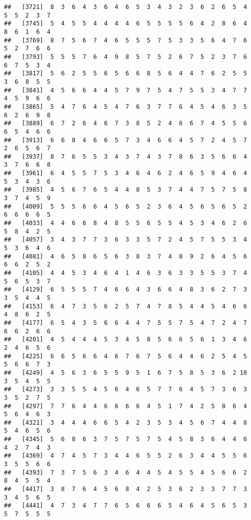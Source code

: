 \documentclass[
]{book}
\begin{document}
\begin{verbatim}
##   [3721]  8  3  6  4  3  6  4  6  5  3  4  3  2  3  6  2  6  5  4  5  5  2  3  7
##   [3745]  5  4  5  5  4  4  4  4  6  5  5  5  5  6  4  2  8  6  4  8  6  1  6  4
##   [3769]  8  7  5  6  7  4  6  5  5  5  7  5  3  3  5  6  4  7  6  5  2  7  6  6
##   [3793]  5  5  5  7  6  4  9  8  5  7  5  2  6  7  5  2  3  7  6  6  7  5  3  4
##   [3817]  5  6  2  5  5  6  5  6  6  8  5  6  4  4  7  6  2  5  5  3  6  8  5  5
##   [3841]  4  5  6  6  4  4  5  7  9  7  5  4  7  5  5  3  4  7  7  4  5  9  6  6
##   [3865]  5  4  7  6  4  5  4  7  6  3  7  7  6  4  5  4  6  3  5  6  2  6  9  8
##   [3889]  6  7  2  6  4  6  7  3  8  5  2  4  6  6  7  4  5  5  6  6  5  4  6  6
##   [3913]  6  6  8  4  6  6  5  7  3  4  6  6  4  5  7  2  4  5  7  2  6  5  6  7
##   [3937]  8  7  6  5  5  3  4  3  7  4  3  7  8  6  3  5  6  6  4  3  7  6  6  8
##   [3961]  6  4  5  5  7  5  3  4  6  4  6  2  4  6  5  9  4  6  4  5  3  4  3  6
##   [3985]  4  5  6  7  6  5  4  4  8  5  3  7  4  4  7  5  7  5  8  3  7  4  5  9
##   [4009]  5  5  5  6  6  4  5  6  5  2  3  6  4  5  6  5  6  5  2  6  6  6  6  5
##   [4033]  4  4  6  6  8  4  8  5  5  6  5  5  4  5  3  4  6  2  6  5  8  4  2  5
##   [4057]  3  4  3  7  7  3  6  3  3  5  7  2  4  5  7  5  5  3  4  5  3  6  4  6
##   [4081]  4  6  5  8  6  5  6  3  8  3  7  4  8  9  2  6  4  5  6  6  6  2  5  2
##   [4105]  4  4  5  3  4  6  4  1  4  6  3  6  3  3  5  5  3  7  4  5  6  5  3  7
##   [4129]  6  5  5  5  7  4  6  6  4  3  6  6  4  8  3  6  2  7  3  3  5  4  4  5
##   [4153]  6  4  7  3  5  6  2  5  7  4  7  8  5  4  4  5  4  6  6  4  8  6  2  5
##   [4177]  6  5  4  3  5  6  6  4  4  7  5  5  7  5  4  7  2  4  7  6  6  2  6  6
##   [4201]  4  5  4  4  4  5  3  4  5  8  5  6  6  5  6  1  3  4  6  2  4  6  5  6
##   [4225]  6  6  5  6  6  4  6  7  6  7  5  6  4  4  6  2  5  4  5  5  6  6  7  3
##   [4249]  4  5  6  3  6  5  5  9  5  1  6  7  5  8  5  3  6  2 10  3  5  4  5  5
##   [4273]  3  3  5  5  4  5  6  4  6  5  7  7  6  4  5  7  3  6  3  3  5  2  7  5
##   [4297]  7  7  6  4  4  6  6  6  6  4  5  1  7  4  2  5  8  6  4  5  6  4  6  3
##   [4321]  3  4  4  4  6  6  5  4  2  3  5  3  4  5  6  7  4  4  8  5  4  6  5  6
##   [4345]  5  6  8  6  3  7  5  7  5  7  5  4  5  8  3  6  4  4  6  4  2  7  4  3
##   [4369]  4  7  4  5  7  3  4  4  6  5  5  2  6  3  4  4  5  5  6  3  5  5  6  6
##   [4393]  7  3  7  5  6  3  4  6  4  4  5  4  5  5  4  5  6  6  2  8  4  5  5  4
##   [4417]  3  8  7  6  4  5  6  8  4  2  5  3  6  2  3  3  7  7  3  3  4  5  6  5
##   [4441]  4  7  3  4  7  7  6  5  6  6  6  5  4  6  4  5  6  5  3  5  7  5  5  5

\end{verbatim}
\end{document}
